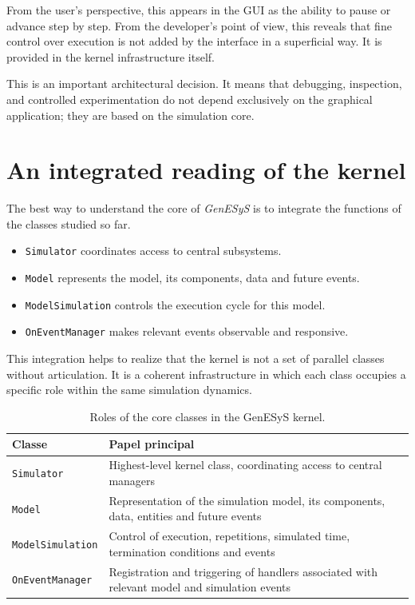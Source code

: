 From the user's perspective, this appears in the GUI as the ability to pause or advance step by step. From the developer's point of view, this reveals that fine control over execution is not added by the interface in a superficial way. It is provided in the kernel infrastructure itself.

This is an important architectural decision. It means that debugging, inspection, and controlled experimentation do not depend exclusively on the graphical application; they are based on the simulation core.

\section{An integrated reading of the kernel}
\label{sec:cap7_leitura_integrada_nucleo}

The best way to understand the core of \textit{GenESyS} is to integrate the functions of the classes studied so far.

\begin{itemize}
 \item \texttt{Simulator} coordinates access to central subsystems.
 \item \texttt{Model} represents the model, its components, data and future events.
 \item \texttt{ModelSimulation} controls the execution cycle for this model.
 \item \texttt{OnEventManager} makes relevant events observable and responsive.
\end{itemize}

This integration helps to realize that the kernel is not a set of parallel classes without articulation. It is a coherent infrastructure in which each class occupies a specific role within the same simulation dynamics.

\begin{table}[htbp]
 \centering
 \caption{Roles of the core classes in the GenESyS kernel.}
 \label{tab:cap7_papeis_classes_centrais}
 \small
 \begin{tabular}{|p{3.3cm}|p{7.2cm}|}
 \hline
 \textbf{Classe} & \textbf{Papel principal} \\
 \hline
 \texttt{Simulator} & Highest-level kernel class, coordinating access to central managers \\
 \hline
 \texttt{Model} & Representation of the simulation model, its components, data, entities and future events \\
 \hline
 \texttt{ModelSimulation} & Control of execution, repetitions, simulated time, termination conditions and events \\
 \hline
 \texttt{OnEventManager} & Registration and triggering of handlers associated with relevant model and simulation events \\
 \hline
 \end{tabular}
\end{table}

